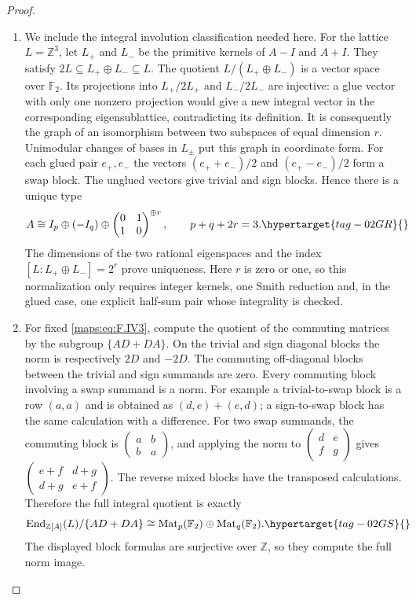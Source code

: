 \documentclass[11pt,a4paper]{article}
\numberwithin{equation}{section}
\theoremstyle{definition}
\begin{document}
\begin{proof}
\begin{enumerate}[label=\arabic*.]
\item We include the integral involution classification needed here.
For the lattice $L=\mathbb Z^3$, let $L_+$ and $L_-$ be the
primitive kernels of $A-I$ and $A+I$.  They satisfy
$2L\subseteq L_+\oplus L_-\subseteq L$.
The quotient $L/(L_+\oplus L_-)$ is a vector space over
$\mathbb F_2$.  Its projections into $L_+/2L_+$ and
$L_-/2L_-$ are injective: a glue vector with only one
nonzero projection would give a new integral vector in the
corresponding eigensublattice, contradicting its definition.
It is consequently the graph of an isomorphism between two
subspaces of equal dimension $r$.
Unimodular changes of bases in $L_\pm$ put this graph in
coordinate form.  For each glued pair $e_+,e_-$ the vectors
$(e_++e_-)/2$ and $(e_+-e_-)/2$ form a swap block.
The unglued vectors give trivial and sign blocks.  Hence
there is a unique type
\begin{equation}
 A\cong I_p\oplus(-I_q)\oplus
 \begin{pmatrix}0&1\\1&0\end{pmatrix}^{\oplus r},
 \qquad p+q+2r=3.                                         \hypertarget{tag-02GR}{}\label{maps:eq:F.IV3}
\end{equation}
The dimensions of the two rational eigenspaces and the
index $[L:L_+\oplus L_-]=2^r$ prove uniqueness.
Here $r$ is zero or one, so this normalization only requires
integer kernels, one Smith reduction and, in the glued case,
one explicit half-sum pair whose integrality is checked.

\item For fixed \eqref{maps:eq:F.IV3}, compute the quotient of the commuting
matrices by the subgroup $\{AD+DA\}$.
On the trivial and sign diagonal blocks the norm is
respectively $2D$ and $-2D$.  The commuting off-diagonal
blocks between the trivial and sign summands are zero.
Every commuting block involving a swap summand is a norm.
For example a trivial-to-swap block is a row $(a,a)$ and
is obtained as $(d,e)+(e,d)$; a sign-to-swap block has the
same calculation with a difference.  For two swap summands,
the commuting block is
$\begin{pmatrix}a&b\\b&a\end{pmatrix}$, and applying the
norm to $\begin{pmatrix}d&e\\f&g\end{pmatrix}$ gives
$\begin{pmatrix}e+f&d+g\\d+g&e+f\end{pmatrix}$.
The reverse mixed blocks have the transposed calculations.
Therefore the full integral quotient is exactly
\begin{equation}
 \operatorname{End}_{\mathbb Z[A]}(L)/\{AD+DA\}
 \cong \operatorname{Mat}_p(\mathbb F_2)
       \oplus\operatorname{Mat}_q(\mathbb F_2).             \hypertarget{tag-02GS}{}\label{maps:eq:F.IV4}
\end{equation}
The displayed block formulas are surjective over $\mathbb Z$, so
they compute the full norm image.


\end{enumerate}
\end{proof}
\end{document}
